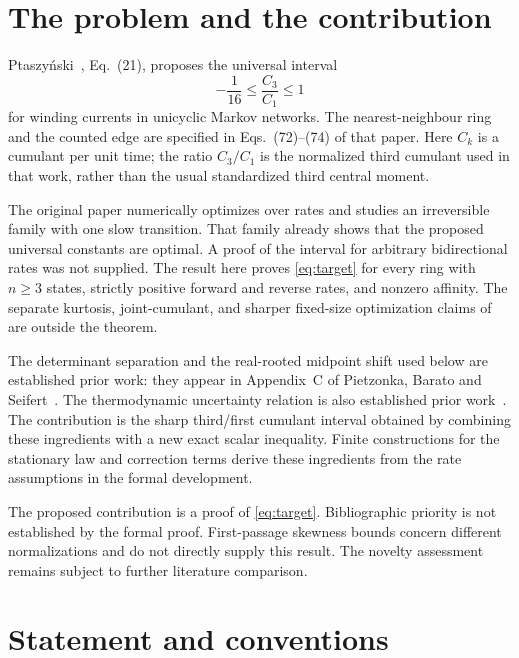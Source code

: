 \documentclass[11pt,a4paper]{article}
\numberwithin{equation}{section}
\theoremstyle{remark}
\begin{document}
\section{The problem and the contribution}

Ptaszy\'nski~\cite{Ptaszynski2022}, Eq.~(21), proposes the universal interval
\begin{equation}\label{eq:target}
  -\frac1{16}\le \frac{C_3}{C_1}\le1
\end{equation}
for winding currents in unicyclic Markov networks. The nearest-neighbour
ring and the counted edge are specified in Eqs.~(72)--(74) of that paper.
Here $C_k$ is a cumulant per unit time; the ratio $C_3/C_1$ is the normalized
third cumulant used in that work, rather than the usual standardized third
central moment.

The original paper numerically optimizes over rates and studies an
irreversible family with one slow transition. That family already shows
that the proposed universal constants are optimal. A proof of the interval
for arbitrary bidirectional rates was not supplied. The result here proves
\eqref{eq:target} for every ring with $n\ge3$ states, strictly positive
forward and reverse rates, and nonzero affinity. The separate kurtosis,
joint-cumulant, and sharper fixed-size optimization claims of
\cite{Ptaszynski2022} are outside the theorem.

The determinant separation and the real-rooted midpoint shift used below
are established prior work: they appear in Appendix~C of Pietzonka, Barato
and Seifert~\cite{Pietzonka2016}. The thermodynamic uncertainty relation is
also established prior work~\cite{Gingrich2016}. The contribution is the
sharp third/first cumulant interval obtained by combining these ingredients
with a new exact scalar inequality. Finite constructions for the stationary law and correction terms derive
these ingredients from the rate assumptions in the formal development.

The proposed contribution is a proof of \eqref{eq:target}. Bibliographic
priority is not established by the formal proof. First-passage skewness bounds
\cite{Barato2015,Wampler2022} concern different normalizations and do not
directly supply this result. The novelty assessment remains subject to further literature comparison.

\section{Statement and conventions}\label{sec:statement}
\end{document}
